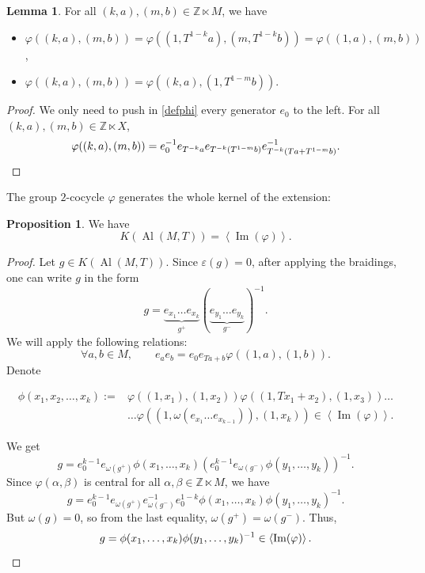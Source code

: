 \documentclass[a4paper,11pt]{amsart}
\theoremstyle{definition}
\newtheorem{lem}[thm]{Lemma}
\newtheorem{prop}[thm]{Proposition}
\newcommand{\Z}{{\mathbb Z}}
\DeclareMathOperator{\im}{Im}
\DeclareMathOperator{\Al}{Al}
\begin{document}
\begin{lem}\label{equivariancedegre1}
For all $(k, a), (m, b)\in \Z\ltimes M$, we have
\begin{itemize}
\item $\varphi((k, a),(m, b)) = \varphi((1, T^{1-k}a),(m, T^{1-k}b)) = \varphi( (1,a), (m,b) )$,
\item $\varphi((k, a),(m, b)) = \varphi((k, a),(1, T^{1-m}b))$.
\end{itemize}
\end{lem}

\begin{proof}
We only need to push in \eqref{defphi} every generator $e_0$ to the left.
For all $(k,a), (m,b)\in \Z\ltimes X$,
\[\varphi((k,a),(m,b)) = e_0^{-1} e_{T^{-k}a} e_{T^{-k} (T^{1-m} b)} e^{-1}_{T^{-k} (Ta + T^{1-m} b)}. \qedhere
\]
\end{proof}

The group $2$-cocycle $\varphi$ generates the whole kernel of the extension:
\begin{prop}
We have
\[
K(\Al(M,T)) = \left< \im(\varphi) \right> .
\]
\end{prop}

\begin{proof}
Let $g\in K(\Al(M,T))$.
Since $\varepsilon(g)=0$, after applying the braidings, one can write $g$ in the form
\[
g= \underbrace{e_{x_1}\ldots e_{x_k}}_{g^+} ( \underbrace{e_{y_1} \ldots e_{y_k}}_{g^-} )^{-1}.
\]
We will apply the following relations:
\[
\forall a,b\in M, \qquad e_a e_b = e_0 e_{Ta+b} \varphi((1,a),(1,b)).
\]
Denote

\[
\begin{array}{ll}
\phi(x_1, x_2, \ldots,x_k):= & \varphi((1,x_1),(1,x_2)) \varphi((1,Tx_1+x_2),(1,x_3)) \ldots\\
& \ldots \varphi( (1,\omega(e_{x_1}\ldots e_{x_{k-1}})), (1,x_k))\in \left<\im(\varphi)\right>.
\end{array}
\]

We get
\[
g=e_0^{k-1} e_{\omega(g^+)} \phi(x_1,\ldots, x_k) \left(e_0^{k-1} e_{\omega(g^-)} \phi(y_1,\ldots,y_k)\right)^{-1}.
\]
Since $\varphi(\alpha,\beta)$ is central for all $\alpha,\beta\in \Z\ltimes M$, we have
\[
g = e_0^{k-1} e_{\omega(g^+)} e^{-1}_{\omega(g^-)} e_0^{1-k} \phi(x_1,\ldots, x_k) \phi(y_1,\ldots,y_k)^{-1}.
\]
But $\omega(g) = 0$, so from the last equality, $\omega(g^+)=\omega(g^-)$.
Thus,
\[
g= \phi(x_1,\ldots, x_k) \phi(y_1,\ldots,y_k)^{-1} \in \left<\im(\varphi)\right>. \qedhere
\]
\end{proof}
\end{document}
